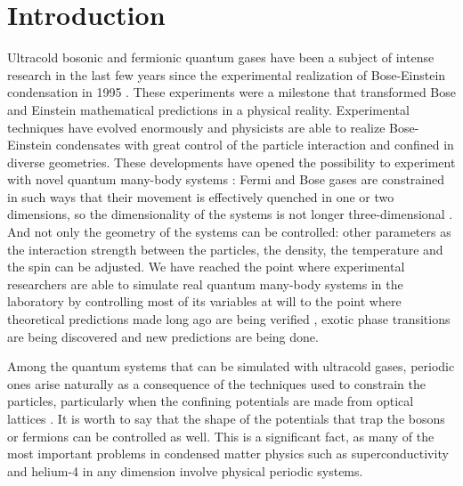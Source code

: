 
\chapter{Introduction}
\label{sec:introduccion}

Ultracold bosonic and fermionic quantum gases have been a subject of intense
research in the last few years since the experimental realization of
Bose-Einstein condensation in 1995 \cite{bib:anderson-science.269.1995,
bib:davis-phys.rev.A.75.3969.1995}. These experiments were a milestone that
transformed Bose and Einstein \cite{bib:einstein-1924-quantentheorie}
mathematical predictions in a physical reality. Experimental techniques have
evolved enormously and physicists are able to realize Bose-Einstein condensates
with great control of the particle interaction and confined in diverse
geometries. These developments have opened the possibility to experiment with
novel quantum many-body systems \cite{bib:takasu-et-al-phys-rev-lett.91.040404,
bib:schreck-f-et-al-phys-rev-lett.87.080403}: Fermi and Bose gases are
constrained in such ways that their movement is effectively quenched in one or
two dimensions, so the dimensionality of the systems is not longer
three-dimensional \cite{bib:a-gorlitz-phys-rev-lett.87.130402}. And not only the
geometry of the systems can be controlled: other parameters as the interaction
strength between the particles, the density, the temperature and the spin can be
adjusted. We have reached the point where experimental researchers are able to
simulate \cite{bib:bloch-nature-physics.2012} real quantum many-body systems in
the laboratory by controlling most of its variables at will to the point where
theoretical predictions made long ago are being verified
\cite{bib:tonks-phys-rev.50.955.1936, bib:girardeau-j-math-phys.1960,
bib:paredes-bloch-et-al-nature.419.2014}, exotic phase transitions are being
discovered and new predictions are being done.

Among the quantum systems that can be simulated with ultracold gases, periodic
ones arise naturally as a consequence of the techniques used to constrain the
particles, particularly when the confining potentials are made from optical
lattices \cite{bib:bloch-nature-phys.2005}. It is worth to say that the shape of
the potentials that trap the bosons or fermions can be controlled as well. This
is a significant fact, as many of the most important problems in condensed
matter physics such as superconductivity
\cite{bib:bednorz-et-al-phys-b-cond-matt.1986, bib:phys-rev-B.50.4260,
bib:norman-pepin-rep-prog-phys.2003} and helium-4 in any dimension
\cite{bib:phys-rev-lett.71.3673, bib:j-phys-soc-jpn.77.111011} involve physical
periodic systems.

